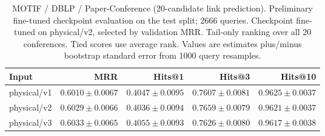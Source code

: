 \begin{table}[t]
\centering
\small
\begin{tabular}{lrrrr}
\toprule
Input & MRR & Hits@1 & Hits@3 & Hits@10 \\
\midrule
physical/v1 & $0.6010 \pm 0.0067$ & $0.4047 \pm 0.0095$ & $0.7607 \pm 0.0081$ & $0.9625 \pm 0.0037$ \\
physical/v2 & $0.6029 \pm 0.0066$ & $0.4036 \pm 0.0094$ & $0.7659 \pm 0.0079$ & $0.9621 \pm 0.0037$ \\
physical/v3 & $0.6033 \pm 0.0065$ & $0.4055 \pm 0.0093$ & $0.7626 \pm 0.0080$ & $0.9617 \pm 0.0038$ \\
\bottomrule
\end{tabular}
\caption{MOTIF / DBLP / Paper-Conference (20-candidate link prediction). Preliminary fine-tuned checkpoint evaluation on the test split; 2666 queries. Checkpoint fine-tuned on physical/v2, selected by validation MRR. Tail-only ranking over all 20 conferences. Tied scores use average rank. Values are estimates plus/minus bootstrap standard error from 1000 query resamples.}
\label{tab:motif-paper_conference-link_prediction}
\end{table}
